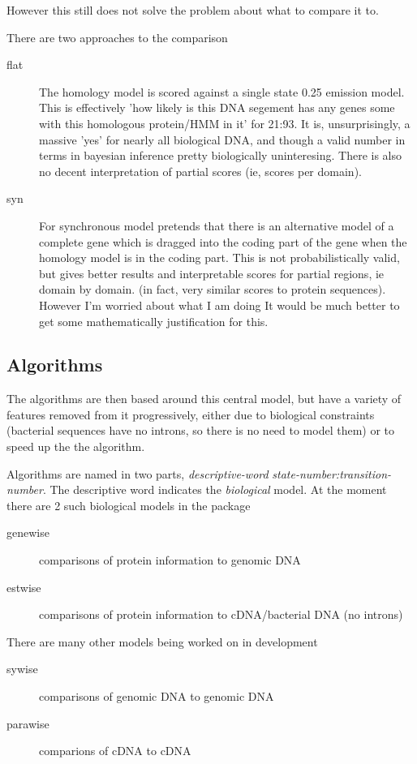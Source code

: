 \documentclass{article}
\begin{document}
However this still does not solve the problem about what to compare it
to.

There are two approaches to the comparison

\begin{description}
\item[flat] The homology model is scored against a single state 0.25 emission
model. This is effectively 'how likely is this DNA segement has any
genes some with this homologous protein/HMM in it' for 21:93. It is,
unsurprisingly, a massive 'yes' for nearly all biological DNA, and
though a valid number in terms in bayesian inference pretty
biologically uninteresing. There is also no decent interpretation of
partial scores (ie, scores per domain).  

\item[syn] For synchronous model pretends that there is an alternative
model of a complete gene which is dragged into the coding part of the
gene when the homology model is in the coding part. This is not
probabilistically valid, but gives better results and interpretable
scores for partial regions, ie domain by domain. (in fact, very
similar scores to protein sequences). However I'm worried about what I
am doing It would be much better to get some mathematically
justification for this.
\end{description}


\subsection{Algorithms}
\label{sec:alg}
The algorithms are then based around this central model, but 
have a variety of features removed from it progressively, either
due to biological constraints (bacterial sequences have no introns,
so there is no need to model them) or to speed up the the algorithm.

Algorithms are named in two parts, \emph{descriptive-word} \emph{state-number:transition-number}.
The descriptive word indicates the \emph{biological} model. At the moment
there are 2 such biological models in the package
\begin{description}
\item[genewise] comparisons of protein information to genomic DNA
\item[estwise] comparisons of protein information to cDNA/bacterial DNA (no
introns)
\end{description}
There are many other models being worked on in development
\begin{description}
\item[sywise] comparisons of genomic DNA to genomic DNA
\item[parawise] comparions of cDNA to cDNA
\end{description}
\end{document}
